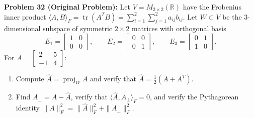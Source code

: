 \documentclass[11pt, letterpaper]{article}
\theoremstyle{definition}
\theoremstyle{remark}
\begin{document}
\medskip

\textbf{Problem 32 (Original Problem):} Let $V = M_{2\times 2}(\mathbb{R})$ have the Frobenius inner product $\langle A, B \rangle_F = \operatorname{tr}(A^T B) = \sum_{i=1}^2 \sum_{j=1}^2 a_{ij}b_{ij}$. Let $W \subset V$ be the $3$-dimensional subspace of symmetric $2 \times 2$ matrices with orthogonal basis
\[
E_1 = \begin{bmatrix} 1 & 0 \\ 0 & 0 \end{bmatrix}, \qquad E_2 = \begin{bmatrix} 0 & 0 \\ 0 & 1 \end{bmatrix}, \qquad E_3 = \begin{bmatrix} 0 & 1 \\ 1 & 0 \end{bmatrix}.
\]
For $A = \begin{bmatrix} 2 & 5 \\ -1 & 4 \end{bmatrix}$:
\begin{enumerate}[label=(\alph*)]
    \item Compute $\hat{A} = \operatorname{proj}_W A$ and verify that $\hat{A} = \frac{1}{2}(A + A^T)$.
    \item Find $A_\perp = A - \hat{A}$, verify that $\langle \hat{A}, A_\perp \rangle_F = 0$, and verify the Pythagorean identity $\|A\|_F^2 = \|\hat{A}\|_F^2 + \|A_\perp\|_F^2$.
\end{enumerate}
\end{document}
